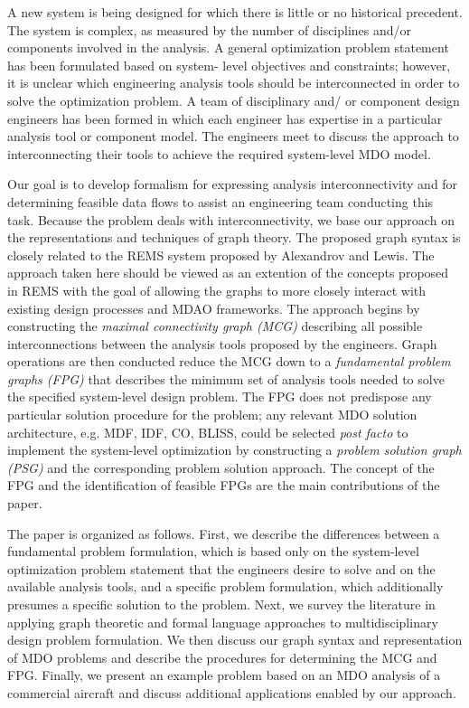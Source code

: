     A new system is being designed for which there is little or no historical precedent. The system
    is complex, as measured by the number of disciplines and/or components involved in the
    analysis. A general optimization problem statement has been formulated based on system-
    level objectives and constraints; however, it is unclear which engineering analysis tools should
    be interconnected in order to solve the optimization problem. A team of disciplinary and/
    or component design engineers has been formed in which each engineer has expertise in a
    particular analysis tool or component model. The engineers meet to discuss the approach to
    interconnecting their tools to achieve the required system-level MDO model.
    
    Our goal is to develop formalism for expressing analysis interconnectivity and for determining feasible
    data flows to assist an engineering team conducting this task. Because the problem deals with
    interconnectivity, we base our approach on the representations and techniques of graph theory. The 
    proposed graph syntax is closely related to the REMS system proposed by 
    Alexandrov and Lewis\cite{alexandrov2004}. The approach taken here should be viewed as an extention 
    of the concepts proposed in REMS with the goal of allowing the graphs to more closely interact with 
    existing design processes and MDAO frameworks. The approach begins by 
    constructing the \emph{maximal connectivity graph (MCG)} describing all possible
    interconnections between the analysis tools proposed by the engineers. Graph operations are then
    conducted reduce the MCG down to a \emph{fundamental problem graphs (FPG)} that describes the minimum set of analysis
    tools needed to solve the specified system-level design problem. The FPG does not predispose
    any particular solution procedure for the problem; any relevant MDO solution architecture, e.g. MDF,
    IDF, CO, BLISS, could be selected \emph{post facto} to implement the system-level optimization by
    constructing a \emph{problem solution graph (PSG)} and the corresponding problem solution approach.
    The concept of the FPG and the identification of feasible FPGs are the main contributions of the paper.

    The paper is organized as follows. First, we describe the differences between a fundamental problem
    formulation, which is based only on the system-level optimization problem statement that the
    engineers desire to solve and on the available analysis tools, and a specific problem formulation, which
    additionally presumes a specific solution to the problem. Next, we survey the literature in applying
    graph theoretic and formal language approaches to multidisciplinary design problem formulation. 
    We then discuss our graph syntax and representation of MDO problems and describe the procedures for 
    determining the MCG and FPG. Finally, we present an example problem based on an MDO analysis of a 
    commercial aircraft and discuss additional applications enabled by our approach.


